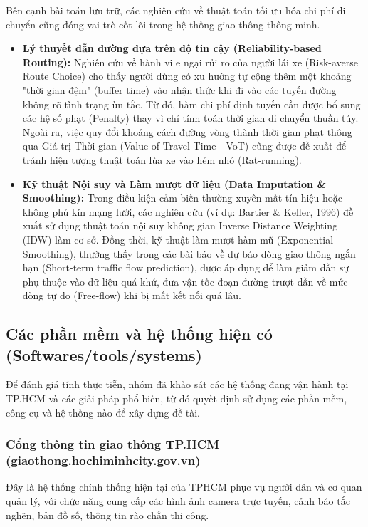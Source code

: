 Bên cạnh bài toán lưu trữ, các nghiên cứu về thuật toán tối ưu hóa chi phí di chuyển cũng đóng vai trò cốt lõi trong hệ thống giao thông thông minh.
\begin{itemize}
    \item \textbf{Lý thuyết dẫn đường dựa trên độ tin cậy (Reliability-based Routing):} Nghiên cứu về hành vi e ngại rủi ro của người lái xe (Risk-averse Route Choice) cho thấy người dùng có xu hướng tự cộng thêm một khoảng "thời gian đệm" (buffer time) vào nhận thức khi đi vào các tuyến đường không rõ tình trạng ùn tắc. Từ đó, hàm chi phí định tuyến cần được bổ sung các hệ số phạt (Penalty) thay vì chỉ tính toán thời gian di chuyển thuần túy. Ngoài ra, việc quy đổi khoảng cách đường vòng thành thời gian phạt thông qua Giá trị Thời gian (Value of Travel Time - VoT) cũng được đề xuất để tránh hiện tượng thuật toán lùa xe vào hẻm nhỏ (Rat-running).
    
    \item \textbf{Kỹ thuật Nội suy và Làm mượt dữ liệu (Data Imputation \& Smoothing):} Trong điều kiện cảm biến thường xuyên mất tín hiệu hoặc không phủ kín mạng lưới, các nghiên cứu (ví dụ: Bartier \& Keller, 1996) đề xuất sử dụng thuật toán nội suy không gian Inverse Distance Weighting (IDW) làm cơ sở. Đồng thời, kỹ thuật làm mượt hàm mũ (Exponential Smoothing), thường thấy trong các bài báo về dự báo dòng giao thông ngắn hạn (Short-term traffic flow prediction), được áp dụng để làm giảm dần sự phụ thuộc vào dữ liệu quá khứ, đưa vận tốc đoạn đường trượt dần về mức dòng tự do (Free-flow) khi bị mất kết nối quá lâu.
\end{itemize}

\subsection{Các phần mềm và hệ thống hiện có (Softwares/tools/systems)}

Để đánh giá tính thực tiễn, nhóm đã khảo sát các hệ thống đang vận hành tại TP.HCM và các giải pháp phổ biến, từ đó quyết định sử dụng các phần mềm, công cụ và hệ thống nào để xây dựng đề tài.

\subsubsection{Cổng thông tin giao thông TP.HCM (giaothong.hochiminhcity.gov.vn)}

Đây là hệ thống chính thống hiện tại của TPHCM phục vụ người dân và cơ quan quản lý, với chức năng cung cấp các hình ảnh camera trực tuyến, cảnh báo tắc nghẽn, bản đồ số, thông tin rào chắn thi công.

